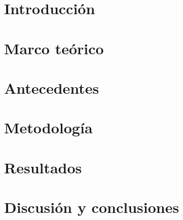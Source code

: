 \documentclass[12pt,letterpaper]{report}
\begin{document}


\tableofcontents
\newpage
\listoffigures

%
%


\newpage
{}

\chapter{Introducción}


\chapter{Marco teórico}


\chapter{Antecedentes}


\chapter{Metodología}


\chapter{Resultados}


\chapter{Discusión y conclusiones}


%

\renewcommand{\bibname}{Referencias}


\end{document}
